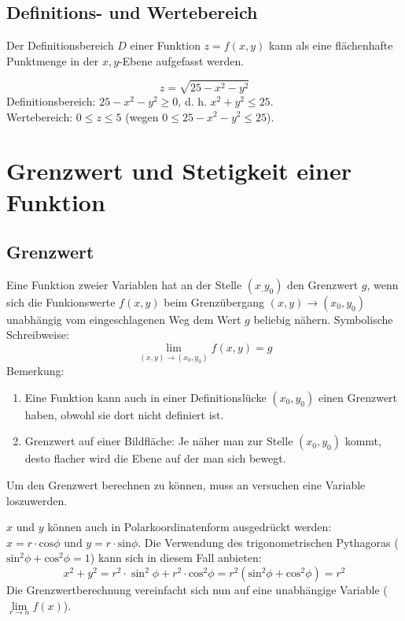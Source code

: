 \subsection{Definitions- und Wertebereich}
Der Definitionsbereich $D$ einer Funktion $z = f(x,y)$ kann als eine flächenhafte Punktmenge in der $x, y$-Ebene aufgefasst werden.
\begin{bsp}
$$z = \sqrt{25-x^2-y^2}$$
Definitionsbereich: $ 25-x^2-y^2 \geq 0$, d. h. $x^2 + y^2 \leq 25$.\\
Wertebereich: $ 0 \leq z \leq 5$ (wegen $0\leq 25 -x^2-y^2 \leq 25$).
\end{bsp}

\section{Grenzwert und Stetigkeit einer Funktion}
\subsection{Grenzwert}
\begin{definition}
Eine Funktion zweier Variablen hat an der Stelle $(x_,y_0)$ den Grenzwert $g$, wenn sich die Funkionswerte $f(x,y)$ beim Grenzübergang $(x,y) \rightarrow (x_0,y_0)$ unabhängig vom eingeschlagenen Weg dem Wert $g$ beliebig nähern. Symbolische Schreibweise:
$$\lim\limits_{(x,y) \rightarrow (x_0,y_0)} f(x,y) = g$$
Bemerkung:
\begin{enumerate}
\item Eine Funktion kann auch in einer Definitionslücke $(x_0,y_0)$ einen Grenzwert haben, obwohl sie dort nicht definiert ist.
\item Grenzwert auf einer Bildfläche: Je näher man zur Stelle $(x_0,y_0)$ kommt, desto flacher wird die Ebene auf der man sich bewegt.
\end{enumerate}
\end{definition}

Um den Grenzwert berechnen zu können, muss an versuchen eine Variable loszuwerden.
\begin{bsp}
$x$ und $y$ können auch in Polarkoordinatenform ausgedrückt werden: $x = r \cdot \text{cos} \phi \text{ und } y = r \cdot \text{sin} \phi$. Die Verwendung des trigonometrischen Pythagoras ($\text{sin}^2 \phi + \text{cos}^2 \phi = 1$) kann sich in diesem Fall anbieten:
$$ x^2 + y^2 =  r^2 \cdot \sin^2 \phi + r^2 \cdot \text{cos}^2 \phi =r^2(\text{sin}^2 \phi + \text{cos}^2 \phi) = r^2$$
Die Grenzwertberechnung vereinfacht sich nun auf eine unabhängige Variable ($\lim\limits_{r\rightarrow n} f(x)$).
\end{bsp}

